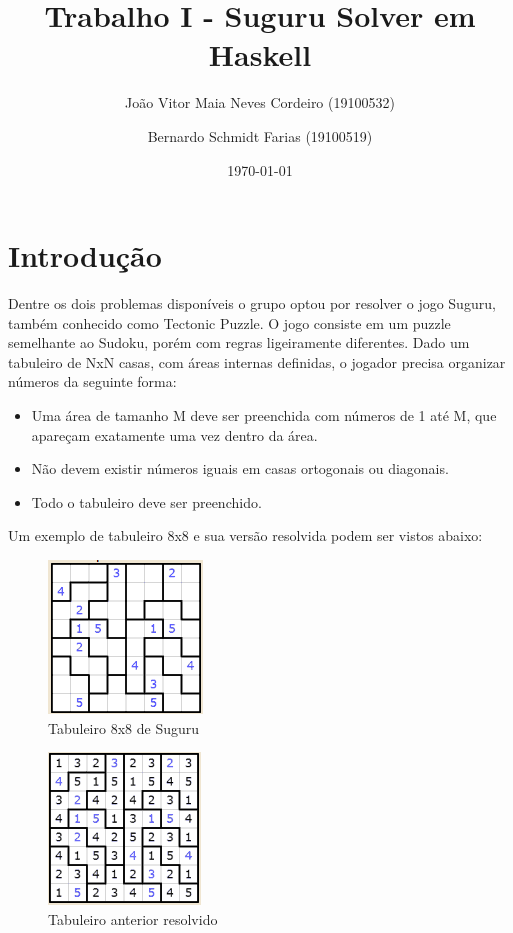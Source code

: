 \documentclass[12pt]{article}
\author{João Vitor Maia Neves Cordeiro (19100532) \and Bernardo Schmidt Farias (19100519)}
\title{Trabalho I - Suguru Solver em Haskell}
\date{\today}
\begin{document}
\maketitle

\section{Introdução}

Dentre os dois problemas disponíveis o grupo optou por resolver o jogo Suguru, também conhecido como Tectonic Puzzle. O jogo consiste em um puzzle semelhante ao Sudoku, porém com regras ligeiramente diferentes. Dado um tabuleiro de NxN casas, com áreas internas definidas, o jogador precisa organizar números da seguinte forma:

\begin{itemize}
    \item Uma área de tamanho M deve ser preenchida com números de 1 até M, que apareçam exatamente uma vez dentro da área.
    \item Não devem existir números iguais em casas ortogonais ou diagonais.
    \item Todo o tabuleiro deve ser preenchido.
\end{itemize}

Um exemplo de tabuleiro 8x8 e sua versão resolvida podem ser vistos abaixo:

\begin{figure}[H]
    \centering
    \includegraphics[width=0.25\linewidth]{example.png}
    \caption{Tabuleiro 8x8 de Suguru}
\end{figure}

\begin{figure}[H]
    \centering
    \includegraphics[width=0.25\linewidth]{solved.png}
    \caption{Tabuleiro anterior resolvido}
\end{figure}
\end{document}
